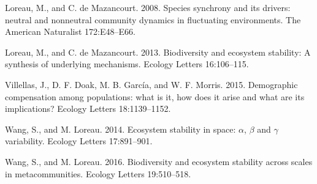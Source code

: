 \documentclass[12pt,]{article}
\begin{document}
Loreau, M., and C. {{de Mazancourt}}. 2008. Species synchrony and its
drivers: neutral and nonneutral community dynamics in fluctuating
environments. The American Naturalist 172:E48--E66.

Loreau, M., and C. {{de Mazancourt}}. 2013. Biodiversity and ecosystem
stability: A synthesis of underlying mechanisms. Ecology Letters
16:106--115.

Villellas, J., D. F. Doak, M. B. Garc{í}a, and W. F. Morris. 2015.
Demographic compensation among populations: what is it, how does it
arise and what are its implications? Ecology Letters 18:1139--1152.

Wang, S., and M. Loreau. 2014. Ecosystem stability in space: \(\alpha\),
\(\beta\) and \(\gamma\) variability. Ecology Letters 17:891--901.

Wang, S., and M. Loreau. 2016. Biodiversity and ecosystem stability
across scales in metacommunities. Ecology Letters 19:510--518.
\end{document}
